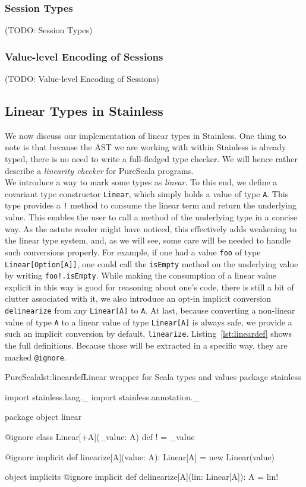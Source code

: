 \documentclass[a4paper,twoside]{article}
\newcommand{\TODO}[1]{\textcolor{YellowOrange}{(TODO: #1)}} %
\newcommand{\RefCode}[1]{Listing~\ref{#1}}
\newcommand{\stt}[1]{\texttt{\small{#1}}}
\begin{document}
\subsubsection{Session Types}
\TODO{Session Types}

\subsubsection{Value-level Encoding of Sessions}
\TODO{Value-level Encoding of Sessions}

\subsection{Linear Types in Stainless}

\newcommand{\lin}[1]{\stt{Linear[#1]}}

We now discuss our implementation of linear types in Stainless. One thing to note is that because the AST we are working with within Stainless is already typed, there is no need to write a full-fledged type checker. We will hence rather describe a \textit{linearity checker} for PureScala programs.\\

We introduce a way to mark some types as \textit{linear}. To this end, we define a covariant type constructor \stt{Linear}, which simply holds a value of type \stt{A}. This type provides a \stt{!} method to consume the linear term and return the underlying value. This enables the user to call a method of the underlying type in a concise way. As the astute reader might have noticed, this effectively adds weakening to the linear type system, and, as we will see, some care will be needed to handle such conversions properly. For example, if one had a value \stt{foo} of type \stt{Linear[Option[A]]}, one could call the \stt{isEmpty} method on the underlying value by writing \stt{foo!.isEmpty}. While making the consumption of a linear value explicit in this way is good for reasoning about one's code, there is still a bit of clutter associated with it, we also introduce an opt-in implicit conversion \stt{delinearize} from any \stt{Linear[A]} to \stt{A}. At last, because converting a non-linear value of type \stt{A} to a linear value of type \stt{Linear[A]} is always safe, we provide a such an implicit conversion by default, \stt{linearize}. \RefCode{lst:lineardef} shows the full definitions. Because those will be extracted in a specific way, they are marked \stt{@ignore}.

\begin{Code}{PureScala}{lst:lineardef}{Linear wrapper for Scala types and values}
package stainless

import stainless.lang._
import stainless.annotation._

package object linear {

  @ignore
  class Linear[+A](_value: A) {
    def ! = _value
  }
  
  @ignore
  implicit def linearize[A](value: A): Linear[A] = new Linear(value)
  
  object implicits {
    @ignore
    implicit def delinearize[A](lin: Linear[A]): A = lin!
  }
}
\end{Code}
\end{document}
